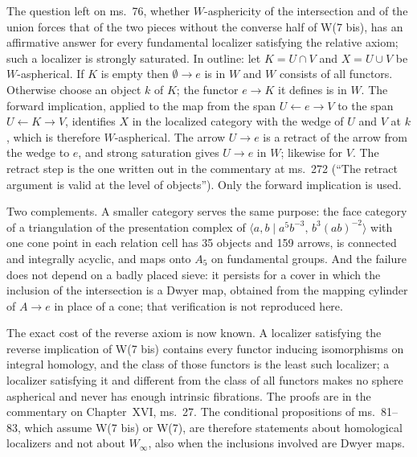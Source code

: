 The question left on ms.~76, whether $W$-asphericity of the intersection and of the union forces that of the two pieces without the converse half of W(7 bis), has an affirmative answer for every fundamental localizer satisfying the relative axiom; such a localizer is strongly saturated. In outline: let $K=U\cap V$ and $X=U\cup V$ be $W$-aspherical. If $K$ is empty then $\emptyset\to e$ is in $W$ and $W$ consists of all functors. Otherwise choose an object $k$ of $K$; the functor $e\to K$ it defines is in $W$. The forward implication, applied to the map from the span $U\leftarrow e\to V$ to the span $U\leftarrow K\to V$, identifies $X$ in the localized category with the wedge of $U$ and $V$ at $k$, which is therefore $W$-aspherical. The arrow $U\to e$ is a retract of the arrow from the wedge to $e$, and strong saturation gives $U\to e$ in $W$; likewise for $V$. The retract step is the one written out in the commentary at ms.~272 (``The retract argument is valid at the level of objects''). Only the forward implication is used.

Two complements. A smaller category serves the same purpose: the face category of a triangulation of the presentation complex of $\langle a,b\mid a^5b^{-3},\,b^3(ab)^{-2}\rangle$ with one cone point in each relation cell has 35 objects and 159 arrows, is connected and integrally acyclic, and maps onto $A_5$ on fundamental groups. And the failure does not depend on a badly placed sieve: it persists for a cover in which the inclusion of the intersection is a Dwyer map, obtained from the mapping cylinder of $A\to e$ in place of a cone; that verification is not reproduced here.

The exact cost of the reverse axiom is now known. A localizer satisfying the reverse implication of W(7 bis) contains every functor inducing isomorphisms on integral homology, and the class of those functors is the least such localizer; a localizer satisfying it and different from the class of all functors makes no sphere aspherical and never has enough intrinsic fibrations. The proofs are in the commentary on Chapter~XVI, ms.~27. The conditional propositions of ms.~81--83, which assume W(7 bis) or W(7), are therefore statements about homological localizers and not about $W_\infty$, also when the inclusions involved are Dwyer maps.
